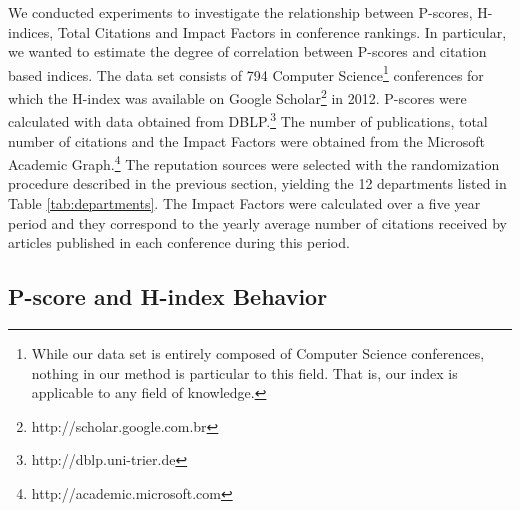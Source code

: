 \documentclass[notitlepage]{svjour3}
\begin{document}
We conducted experiments to investigate the relationship between P-scores, H-indices, Total Citations
and Impact Factors in conference rankings. In particular, we wanted to estimate the degree of correlation 
between P-scores and citation based indices. The data set consists of 794
Computer Science\footnote{
While our data set is entirely composed of Computer Science conferences, nothing in our method is
particular to this field. That is, our index is applicable to any field of knowledge.
} 
conferences
for which the H-index was available on Google Scholar\footnote{http://scholar.google.com.br}
in 2012. P-scores were calculated with
data obtained from DBLP.\footnote{http://dblp.uni-trier.de} The number of publications,
total number of citations and the Impact Factors were obtained from the Microsoft
Academic Graph.\footnote{http://academic.microsoft.com}
The reputation sources
were selected with the randomization procedure described in the previous section, 
yielding the 12 departments listed in Table \ref{tab:departments}. The Impact Factors 
were calculated over a five year period and they correspond to the yearly 
average number of citations received by articles published in each conference during 
this period.


\subsection{P-score and H-index Behavior}
\end{document}
